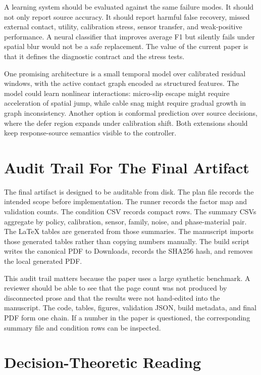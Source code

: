 \documentclass{article}
\begin{document}
A learning system should be evaluated against the same failure modes. It should not only report source accuracy. It should report harmful false recovery, missed external contact, utility, calibration stress, sensor transfer, and weak-positive performance. A neural classifier that improves average F1 but silently fails under spatial blur would not be a safe replacement. The value of the current paper is that it defines the diagnostic contract and the stress tests.

One promising architecture is a small temporal model over calibrated residual windows, with the active contact graph encoded as structured features. The model could learn nonlinear interactions: micro-slip escape might require acceleration of spatial jump, while cable snag might require gradual growth in graph inconsistency. Another option is conformal prediction over source decisions, where the defer region expands under calibration shift. Both extensions should keep response-source semantics visible to the controller.

\section{Audit Trail For The Final Artifact}

The final artifact is designed to be auditable from disk. The plan file records the intended scope before implementation. The runner records the factor map and validation counts. The condition CSV records compact rows. The summary CSVs aggregate by policy, calibration, sensor, family, noise, and phase-material pair. The LaTeX tables are generated from those summaries. The manuscript imports those generated tables rather than copying numbers manually. The build script writes the canonical PDF to Downloads, records the SHA256 hash, and removes the local generated PDF.

This audit trail matters because the paper uses a large synthetic benchmark. A reviewer should be able to see that the page count was not produced by disconnected prose and that the results were not hand-edited into the manuscript. The code, tables, figures, validation JSON, build metadata, and final PDF form one chain. If a number in the paper is questioned, the corresponding summary file and condition rows can be inspected.

\section{Decision-Theoretic Reading}
\end{document}
